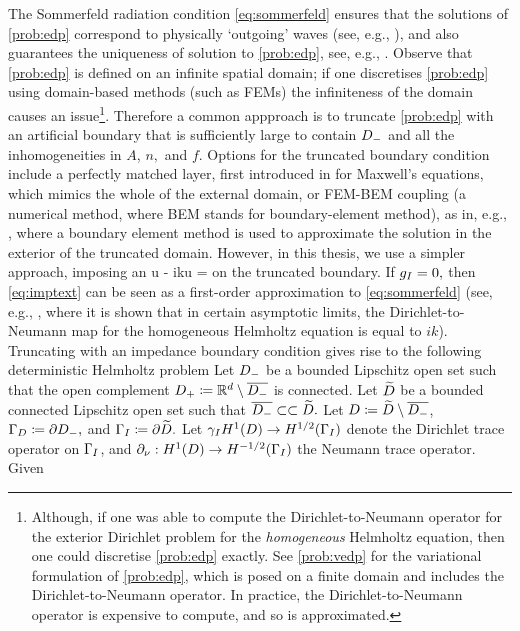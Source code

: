 The Sommerfeld radiation condition \eqref{eq:sommerfeld} ensures that the solutions of \cref{prob:edp} correspond to physically `outgoing' waves (see, e.g., \cite[Section 1.1.3]{Ih:98}), and also guarantees the uniqueness of solution to \cref{prob:edp}, see, e.g., \cite[p. 16]{CoKr:13}. Observe that \cref{prob:edp} is defined on an infinite spatial domain; if one discretises \cref{prob:edp} using domain-based methods (such as FEMs) the infiniteness of the domain causes an issue\footnote{Although, if one was able to compute the Dirichlet-to-Neumann operator for the exterior Dirichlet problem for the \emph{homogeneous} Helmholtz equation, then one could discretise \cref{prob:edp} exactly. See \cref{prob:vedp} for the variational formulation of \cref{prob:edp}, which is posed on a finite domain and includes the Dirichlet-to-Neumann operator. In practice, the Dirichlet-to-Neumann operator is expensive to compute, and so is approximated.}. Therefore a common appproach is to truncate \cref{prob:edp} with an artificial boundary that is sufficiently large to contain $D_{-}$ and all the inhomogeneities in $A$, $n,$ and $f.$ Options for the truncated boundary condition include a perfectly matched layer, first introduced in \cite{Be:94} for Maxwell's equations, which mimics the whole of the external domain, or FEM-BEM coupling (a numerical method, where BEM stands for boundary-element method), as in, e.g., \cite{HiMe:06}, where a boundary element method is used to approximate the solution in the exterior of the truncated domain. However, in this thesis, we  use a simpler approach, imposing an 
\beq\label{eq:imptext}
\dn u - iku = \gI
\eeq
on the truncated boundary. If $g_{I} = 0,$ then \eqref{eq:imptext} can be seen as a first-order approximation to \eqref{eq:sommerfeld} (see, e.g., \cite[p. 353]{GaMuSp:19}, where it is shown that in certain asymptotic limits, the Dirichlet-to-Neumann map for the homogeneous Helmholtz equation is equal to $ik$). Truncating with an impedance boundary condition gives rise to the following deterministic Helmholtz problem
\label{prob:tedp}
 Let $D_{-}$ be a bounded Lipschitz open set such that the open complement $D_{+} \coloneqq \mathbb R^{d} \setminus \overline{D_{-}}$ is connected. Let $\widetilde{D}$ be a bounded connected Lipschitz open set such that $\overline{D_{-}} \subset\subset \widetilde{D}.$ Let $D \coloneqq \widetilde{D} \setminus \overline{D_{-}}$, $\Gamma_{D} \coloneqq \partial D_{-},$ and $\Gamma_{I} \coloneqq \partial \widetilde{D}.$ Let $\trI \HoD\rightarrow\HhGI$ denote the Dirichlet trace operator on $\Gamma_{I}$, and $\dn:\HoD\rightarrow\HmhGI$ the Neumann trace operator. Given
